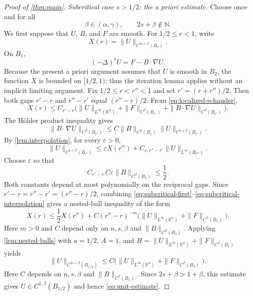 \documentclass[10pt,a4paper]{amsart}
\numberwithin{equation}{section}
\newcommand{\R}{\mathbb R}
\newcommand{\rev}[1]{#1}
\begin{document}
\begin{proof}[Proof of \cref{thm:main}]
\smallskip
\noindent\emph{Subcritical case $s>1/2$: the a priori estimate.}
Choose once and for all
\[
 \beta\in(\alpha,\gamma),\qquad 2s+\beta\notin\mathbb N.
\]
We first suppose that $U$, $B$, and $F$ are smooth.  For
$1/2\le r<1$, write
\[
 X(r)=\|U\|_{C^{2s+\beta}(B_r)}.
\]
On $B_1$,
\[
 (-\Delta)^sU=F-B\cdot\nabla U.
\]
Because the present a priori argument assumes that $U$ is smooth in $B_2$,
the function $X$ is bounded on $[1/2,1)$; thus the iteration lemma applies
without an implicit limiting argument.
\rev{Fix $1/2\le r<r''<1$ and set $r'=(r+r'')/2$.  Then both gaps
$r'-r$ and $r''-r'$ equal $(r''-r)/2$.  From
\eqref{eq:localized-schauder},}
\begin{equation}\label{eq:subcritical-first}
 X(r)\le C_{r'-r}\bigl(
 \|U\|_{L^\infty(\R^n)}+\|F\|_{C^\beta(B_{r'})}
 +\|B\cdot\nabla U\|_{C^\beta(B_{r'})}\bigr).
\end{equation}
The H\"older product inequality gives
\begin{equation}\label{eq:product}
 \|B\cdot\nabla U\|_{C^\beta(B_{r'})}
 \le C\|B\|_{C^\beta(B_1)}
       \|U\|_{C^{1+\beta}(B_{r'})}.
\end{equation}
By \cref{lem:interpolation}, for every $\varepsilon>0$,
\begin{equation}\label{eq:subcritical-interpolation}
 \|U\|_{C^{1+\beta}(B_{r'})}
 \le \varepsilon X(r'')
 +C_{\varepsilon,r''-r'}\|U\|_{L^\infty(B_{r''})}.
\end{equation}
\rev{Choose $\varepsilon$ so that
\[
 C_{r'-r}\,C\varepsilon\|B\|_{C^\beta(B_1)}\le\frac12.
\]
Both constants depend at most polynomially on the reciprocal gaps.  Since
$r'-r=r''-r'=(r''-r)/2$, combining
\eqref{eq:subcritical-first}--\eqref{eq:subcritical-interpolation} gives a
nested-ball inequality of the form
\begin{equation}\label{eq:nested}
 X(r)\le\frac12X(r'')
 +C(r''-r)^{-m}\bigl(
 \|U\|_{L^\infty(\R^n)}+\|F\|_{C^\beta(B_1)}\bigr).
\end{equation}
Here $m>0$ and $C$ depend only on $n,s,\beta$ and
$\|B\|_{C^\beta(B_1)}$.}
Applying \cref{lem:nested-balls} with $a=1/2$, $A=1$, and
$H=\|U\|_{L^\infty(\R^n)}+\|F\|_{C^\beta(B_1)}$ yields
\begin{equation}\label{eq:subcritical-schauder}
 \|U\|_{C^{2s+\beta}(B_{1/2})}
 \le C\bigl(
 \|U\|_{L^\infty(\R^n)}+\|F\|_{C^\beta(B_1)}\bigr).
\end{equation}
Here $C$ depends on $n,s,\beta$ and
$\|B\|_{C^\beta(B_1)}$.  Since $2s+\beta>1+\beta$, this estimate gives
$U\in C^{1,\beta}(B_{1/2})$ and hence \eqref{eq:unit-estimate}.


\end{proof}
\end{document}
